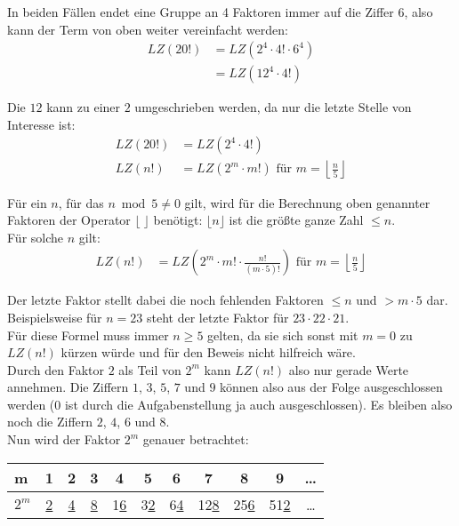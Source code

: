 In beiden Fällen endet eine Gruppe an 4 Faktoren immer auf die Ziffer $6$, also kann der Term von oben weiter vereinfacht werden:
\begin{equation*}
	\begin{split}
		LZ(20!) &= LZ\left(2^4 \cdot 4! \cdot 6^4\right) \\
		&= LZ\left(12^4 \cdot 4!\right)
	\end{split}
\end{equation*}

Die $12$ kann zu einer $2$ umgeschrieben werden, da nur die letzte Stelle von Interesse ist:
\begin{equation*}
	\begin{split}
		LZ(20!) &= LZ\left(2^4 \cdot 4!\right) \\
		LZ(n!) &= LZ\left(2^m \cdot m!\right) \text{ für } m = \left\lfloor\frac{n}{5}\right\rfloor
	\end{split}
\end{equation*}

Für ein $n$, für das $n\bmod 5 \neq 0$ gilt, wird für die Berechnung oben genannter Faktoren der Operator $\lfloor\;\rfloor$ benötigt: $\lfloor n \rfloor$ ist die größte ganze Zahl $\leq n$.
\\[10pt]
Für solche $n$ gilt:
\begin{equation*}
	\begin{split}
		LZ(n!) &= LZ\left(2^m \cdot m! \cdot \frac{n!}{(m\cdot5)!} \right) \text{ für } m = \left\lfloor\frac{n}{5}\right\rfloor
	\end{split}
\end{equation*}

Der letzte Faktor stellt dabei die noch fehlenden Faktoren $\leq n$ und $> m\cdot5$ dar. Beispielsweise für $n=23$ steht der letzte Faktor für $23\cdot22\cdot21$.
\\[10pt]
Für diese Formel muss immer $n\geq5$ gelten, da sie sich sonst mit $m=0$ zu $LZ(n!)$ kürzen würde und für den Beweis nicht hilfreich wäre.
\\[10pt]
Durch den Faktor $2$ als Teil von $2^m$ kann $LZ(n!)$ also nur gerade Werte annehmen. Die Ziffern $1$, $3$, $5$, $7$ und $9$ können also aus der Folge ausgeschlossen werden ($0$ ist durch die Aufgabenstellung ja auch ausgeschlossen). Es bleiben also noch die Ziffern $2$, $4$, $6$ und $8$.
\\[10pt]
Nun wird der Faktor $2^m$ genauer betrachtet:

\begin{table}[h!]
	\hspace{0.5cm}\begin{tabular}{l|c|c|c|c|c|c|c|c|c|c}
		m & 1 & 2 & 3 & 4 & 5 & 6 & 7 & 8 & 9 & \dots \\
		\hline
		$2^m$ & \underline{2} & \underline{4} & \underline{8} & 1\underline{6} & 3\underline{2} & 6\underline{4} & 12\underline{8} & 25\underline{6} & 51\underline{2} & \dots \\
	\end{tabular}
\end{table}

